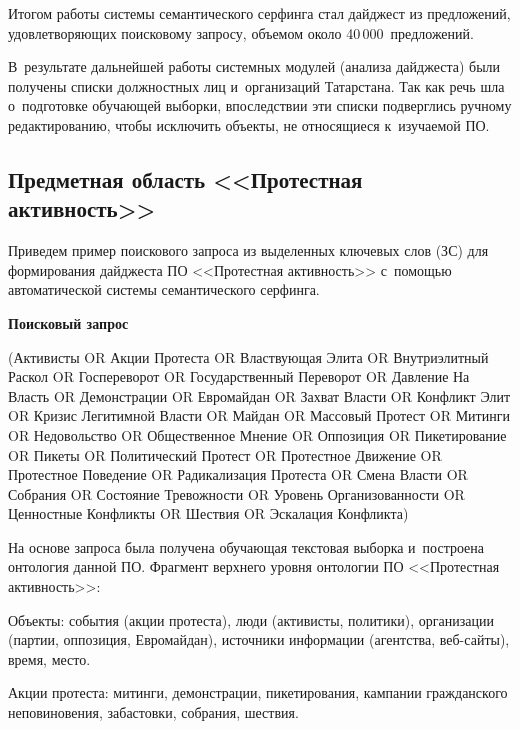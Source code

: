 \begin{multicols}{2}
Итогом работы системы семантического серфинга стал
дайджест из предложений, удовлетво\-ря\-ющих поисковому запросу, объемом
около 40\,000~предложений.

В~результате дальнейшей работы системных
модулей (анализа дайд\-жеста) были получены списки должностных лиц и~организаций Татарстана. Так как речь шла о~подготовке обучающей выборки,
впоследствии эти списки подверглись ручному редактированию, чтобы
исключить объекты, не относящиеся к~изуча\-емой ПО.

\vspace*{-4pt}

     \subsection{Предметная область <<Протестная активность>>}

     Приведем пример поискового запроса из выделенных ключевых слов
(ЗС) для формирования дайджеста ПО <<Протестная
активность>> с~по\-мощью автоматической системы семантического сер\-финга.

\smallskip

      \textbf{Поисковый запрос}

      \smallskip

     \noindent
     {\sf (Активисты OR Акции Протеста OR Власт\-ву\-ющая Элита OR
Внутриэлитный Раскол OR Госпереворот OR Государственный Переворот OR Давление
На Власть OR Демонстрации OR Евромайдан OR Захват Власти OR Конфликт Элит OR
Кризис Легитимной Власти OR Майдан OR Массовый Протест OR Митинги OR
Недовольство OR Общественное Мнение OR Оппозиция OR Пикетирование OR Пикеты
OR Политический Протест OR Протестное Движение OR Протестное Поведение OR
Радикализация Протеста OR Смена Власти OR Собрания OR Состояние Тревожности OR
Уровень Организованности OR Ценностные Конфликты OR Шествия OR Эскалация
Конфликта)}

     На основе запроса была получена обучающая текстовая выборка и~построена онтология данной ПО. Фрагмент верхнего уровня
онтологии ПО <<Протестная активность>>:

  \noindent
  {\sf   Объекты: события (акции протеста), люди (активисты, политики),
организации (партии, оппозиция, Евромайдан), источники информации
(агентства, веб-сай\-ты), время, место}.

 \noindent
 {\sf    Акции протеста: митинги, демонстрации, пикетирования, кампании
гражданского неповиновения, за\-бас\-тов\-ки, собрания, шествия}.


\end{multicols}
